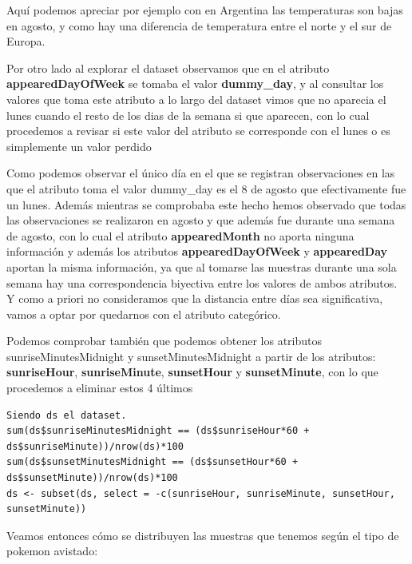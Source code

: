 Aquí podemos apreciar por ejemplo con en Argentina las temperaturas son bajas en agosto, y como hay una diferencia de temperatura entre el norte y el sur de Europa.

Por otro lado al explorar el dataset observamos que en el atributo \textbf{appearedDayOfWeek} se tomaba el valor \textbf{dummy\_day}, y al consultar los valores que toma este atributo a lo largo del dataset vimos que no aparecia el lunes cuando el resto de los dias de la semana si que aparecen, con lo cual procedemos a revisar si este valor del atributo se corresponde con el lunes o es simplemente un valor perdido

Como podemos observar el único día en el que se registran observaciones en las que el atributo toma el valor dummy\_day es el 8 de agosto que efectivamente fue un lunes. Además mientras se comprobaba este hecho hemos observado que todas las observaciones se realizaron en agosto y que además fue durante una semana de agosto, con lo cual el atributo \textbf{appearedMonth} no aporta ninguna información y además los atributos \textbf{appearedDayOfWeek} y \textbf{appearedDay} aportan la misma información, ya que al tomarse las muestras durante una sola semana hay una correspondencia biyectiva entre los valores de ambos atributos. Y como a priori no consideramos que la distancia entre días sea significativa, vamos a optar por quedarnos con el atributo categórico.

Podemos comprobar también que podemos obtener los atributos sunriseMinutesMidnight y sunsetMinutesMidnight a partir de los atributos: \textbf{sunriseHour}, \textbf{sunriseMinute}, \textbf{sunsetHour} y \textbf{sunsetMinute}, con lo que procedemos a eliminar estos 4 últimos

\begin{lstlisting}
Siendo ds el dataset.
sum(ds$sunriseMinutesMidnight == (ds$sunriseHour*60 + ds$sunriseMinute))/nrow(ds)*100
sum(ds$sunsetMinutesMidnight == (ds$sunsetHour*60 + ds$sunsetMinute))/nrow(ds)*100
ds <- subset(ds, select = -c(sunriseHour, sunriseMinute, sunsetHour, sunsetMinute))
\end{lstlisting}

Veamos entonces cómo se distribuyen las muestras que tenemos según el tipo de pokemon avistado:

